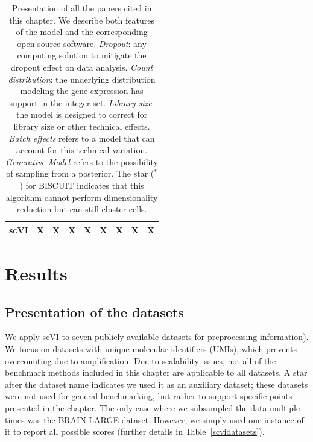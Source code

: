 \begin{table}
{\begin{small}
\begin{tabular}{lcccccccc}
\textbf{scVI}            & X                & X                                                                     & X                     & X                                                                 & X                                                                   & X                                                                            & X                   & X                                                                         \\
\bottomrule
\end{tabular}
\end{small}
}
\caption[Presentation of all the papers cited in this chapter]{Presentation of all the papers cited in this chapter. We describe both features of the model and the corresponding open-source software. \emph{Dropout}: any computing solution to mitigate the dropout effect on data analysis. \emph{Count distribution}: the underlying distribution modeling the gene expression has support in the integer set. \emph{Library size}: the model is designed to correct for library size or other technical effects. \emph{Batch effects} refers to a model that can account for this technical variation. \emph{Generative Model} refers to the possibility of sampling from a posterior. The star ($^*$) for BISCUIT indicates that this algorithm cannot perform dimensionality reduction but can still cluster cells.}
\label{scvialgorithms_pres}
\end{table}



\section{Results}

\subsection{Presentation of the datasets}

We apply scVI to seven publicly available datasets for preprocessing information). We focus on datasets with unique molecular identifiers (UMIs), which prevents overcounting due to amplification. Due to scalability issues, not all of the benchmark methods included in this chapter are applicable to all datasets. A star after the dataset name indicates we used it as an auxiliary dataset; these datasets were not used for general benchmarking, but rather to support specific points presented in the chapter. The only case where we subsampled the data multiple times was the BRAIN-LARGE dataset. However, we simply used one instance of it to report all possible scores (further details in Table~\ref{scvidatasets}).

